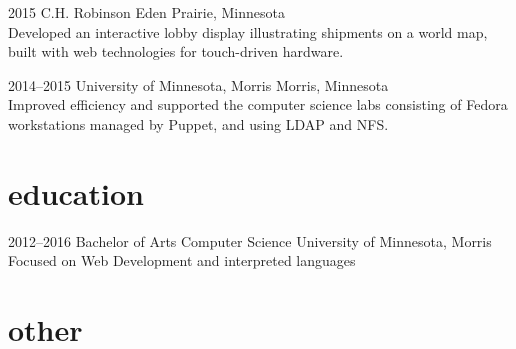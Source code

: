 \documentclass[]{cv-style} %
\begin{document}
\begin{entrylist}

\entry
{2015}
{C.H. Robinson}
{Eden Prairie, Minnesota}
{ \\
Developed an interactive lobby display illustrating shipments on a world map, built with web technologies for touch-driven hardware.}


\entry
{2014--2015}
{University of Minnesota, Morris}
{Morris, Minnesota}
{ \\
Improved efficiency and supported the computer science labs consisting of Fedora workstations managed by Puppet, and using LDAP and NFS.}


\end{entrylist}


\section{education}

\begin{entrylist}


\entry
{2012--2016}
{Bachelor of Arts {\normalfont Computer Science}}
{University of Minnesota, Morris}
{\small{Focused on Web Development and interpreted languages}}


\end{entrylist}


\section{other}
\end{document}
